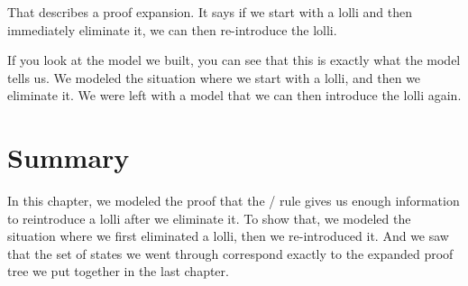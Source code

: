 \documentclass[../../../main.tex]{subfiles}
\begin{document}
\noindent
That describes a proof expansion. It says if we start with a lolli and then immediately eliminate it, we can then re-introduce the lolli.

If you look at the model we built, you can see that this is exactly what the model tells us. We modeled the situation where we start with a lolli, and then we eliminate it. We were left with a model that we can then introduce the lolli again.


\section{Summary}

In this chapter, we modeled the proof that the \lolliElim/ rule gives us enough information to reintroduce a lolli after we eliminate it. To show that, we modeled the situation where we first eliminated a lolli, then we re-introduced it. And we saw that the set of states we went through correspond exactly to the expanded proof tree we put together in the last chapter.
\end{document}
